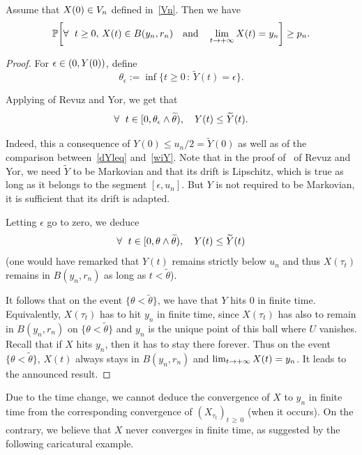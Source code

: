 \documentclass[AHL,Unicode,longabstracts,published]{cedram}
\newcommand{\PP}{\mathbb{P}}
\newcommand{\iy}{\infty}
\newcommand{\wi}{\widetilde}
\newcommand{\fo}{\forall\ }
\let\originalleft\left
\let\originalright\right
\renewcommand{\left}{\mathopen{}\mathclose\bgroup\originalleft}
\renewcommand{\right}{\aftergroup\egroup\originalright}
\let\oldin\in
\renewcommand{\in}{\mathchoice{\oldin}{\oldin}{\,\oldin\,}{\,\oldin\,}}
\renewcommand*{\to}{\mathchoice{\longrightarrow}{\rightarrow}{\rightarrow}{\rightarrow}}
\let\oldforall\forall
\renewcommand*{\forall}{\mathrel{\oldforall}}
\begin{document}
\begin{lemm}\label{fini}
Assume that $X(0)\in V_n$ defined in~\eqref{Vn}. Then we have
\begin{equation*}
\PP\left[\fo t\geq 0,\, X(t)\in B(y_n,r_n)\quad\text{and}\quad \lim_{t\to +\iy} X(t)=y_n\right] \geq p_n.
\end{equation*}
\end{lemm}
\begin{proof}
For $\epsilon \in(0, Y(0))$, define
\begin{equation*}
\theta_\epsilon := \inf\{t\geq 0\,:\, \wi Y(t)=\epsilon\}.
\end{equation*}


Applying \cite[Theorem~3.7]{MR1725357} of Revuz and Yor, we get that
\begin{equation*}
\fo t\in[0, \theta_\epsilon\wedge \wi\theta),\quad Y(t) \leq \wi Y(t).
\end{equation*}


Indeed, this a consequence of $Y(0)\leq u_n/2=\wi Y(0)$ as well as of the comparison between~\eqref{dYleq} and~\eqref{wiY}. Note that in the proof of~\cite[Theorem~(3.7)]{MR1725357} of Revuz and Yor, we need $\wi Y$ to be Markovian and that its drift is Lipschitz, which is true as long as it belongs to the segment $[\epsilon, u_n]$. But $Y$ is not required to be Markovian, it is sufficient that its drift is adapted.


Letting $\epsilon$ go to zero, we deduce
\begin{equation*}
\fo t\in[0, \theta\wedge \wi\theta),\quad Y(t) \leq \wi Y(t)
\end{equation*}
(one would have remarked that $Y(t)$ remains strictly below $u_n$ and thus $X(\tau_t)$ remains in $B(y_n,r_n)$ as long as $t< \wi \theta$).


It follows that on the event $\{\theta<\wi\theta\}$, we have that $Y$ hits 0 in finite time. Equivalently, $X(\tau_t)$ has to hit $y_n$ in finite time, since $X(\tau_t)$ has also to remain in $B(y_n,r_n)$ on $\{\theta<\wi\theta\}$ and $y_n$ is the unique point of this ball where $U$ vanishes. Recall that if $X$ hits $y_n$, then it has to stay there forever. Thus on the event $\{\theta<\wi\theta\}$, $X(t)$ always stays in $ B(y_n,r_n)$ and $\lim_{t\to +\iy}X(t)=y_n$. It leads to the announced result.
\end{proof}


Due to the time change, we cannot deduce the convergence of $X$ to $y_n$ in finite time from the corresponding convergence of $(X_{\tau_t})_{t\,\geq\,0}$ (when it occurs). On the contrary, we believe that $X$ never converges in finite time, as suggested by the following caricatural example.
\end{document}
